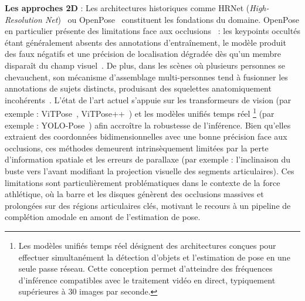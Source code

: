 \textbf{Les approches 2D} : Les architectures historiques comme HRNet (\textit{High-Resolution Net})~\cite{HRNet-2019} ou OpenPose~\cite{OpenPose-2019} constituent les fondations du domaine. OpenPose en particulier présente des limitations face aux occlusions~\cite{OpenPose-2019} : les keypoints occultés étant généralement absents des annotations d'entraînement, le modèle produit des faux négatifs et une précision de localisation dégradée dès qu'un membre disparaît du champ visuel~\cite{OpenPose-2019}. De plus, dans les scènes où plusieurs personnes se chevauchent, son mécanisme d'assemblage multi-personnes tend à fusionner les annotations de sujets distincts, produisant des squelettes anatomiquement incohérents~\cite{OpenPose-2019}. L'état de l'art actuel s'appuie sur les transformeurs de vision (par exemple : ViTPose~\cite{ViTPose-2022}, ViTPose++~\cite{ViTPose++-2024}) et les modèles unifiés temps réel \footnote{Les modèles unifiés temps réel désignent des architectures conçues pour effectuer simultanément la détection d'objets et l'estimation de pose en une seule passe réseau. Cette conception permet d'atteindre des fréquences d'inférence compatibles avec le traitement vidéo en direct, typiquement supérieures à 30 images par seconde.} (par exemple : YOLO-Pose~\cite{YOLO-Pose-2022}) afin accroître la robustesse de l'inférence. Bien qu'elles extraient des coordonnées bidimensionnelles avec une bonne précision face aux occlusions, ces méthodes demeurent intrinsèquement limitées par la perte d'information spatiale et les erreurs de parallaxe (par exemple : l'inclinaison du buste vers l'avant modifiant la projection visuelle des segments articulaires). Ces limitations sont particulièrement problématiques dans le contexte de la force athlétique, où la barre et les disques génèrent des occlusions massives et prolongées sur des régions articulaires clés, motivant le recours à un pipeline de complétion amodale en amont de l'estimation de pose.

